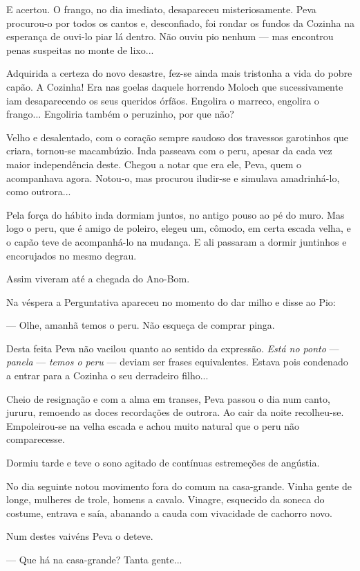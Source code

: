E acertou. O frango, no dia imediato, desapareceu misteriosamente. Peva
procurou-o por todos os cantos e, desconfiado, foi rondar os fundos da
Cozinha na esperança de ouvi-lo piar lá dentro. Não ouviu pio nenhum ---
mas encontrou penas suspeitas no monte de lixo...

Adquirida a certeza do novo desastre, fez-se ainda mais tristonha a vida
do pobre capão. A Cozinha! Era nas goelas daquele horrendo Moloch que
sucessivamente iam desaparecendo os seus queridos órfãos. Engolira o
marreco, engolira o frango... Engoliria também o peruzinho, por que não?

Velho e desalentado, com o coração sempre saudoso dos travessos
garotinhos que criara, tornou-se macambúzio. Inda passeava com o peru,
apesar da cada vez maior independência deste. Chegou a notar que era
ele, Peva, quem o acompanhava agora. Notou-o, mas procurou iludir-se e
simulava amadrinhá-lo, como outrora...

Pela força do hábito inda dormiam juntos, no antigo pouso ao pé do muro.
Mas logo o peru, que é amigo de poleiro, elegeu um, cômodo, em certa
escada velha, e o capão teve de acompanhá-lo na mudança. E ali passaram
a dormir juntinhos e encorujados no mesmo degrau.

Assim viveram até a chegada do Ano-Bom.

Na véspera a Perguntativa apareceu no momento do dar milho e disse ao
Pio:

--- Olhe, amanhã temos o peru. Não esqueça de comprar pinga.

Desta feita Peva não vacilou quanto ao sentido da expressão. \emph{Está
no ponto} --- \emph{panela} --- \emph{temos o peru} --- deviam ser
frases equivalentes. Estava pois condenado a entrar para a Cozinha o seu
derradeiro filho...

Cheio de resignação e com a alma em transes, Peva passou o dia num
canto, jururu, remoendo as doces recordações de outrora. Ao cair da
noite recolheu-se. Empoleirou-se na velha escada e achou muito natural
que o peru não comparecesse.

Dormiu tarde e teve o sono agitado de contínuas estremeções de angústia.

No dia seguinte notou movimento fora do comum na casa-grande. Vinha
gente de longe, mulheres de trole, homens a cavalo. Vinagre, esquecido
da soneca do costume, entrava e saía, abanando a cauda com vivacidade de
cachorro novo.

Num destes vaivéns Peva o deteve.

--- Que há na casa-grande? Tanta gente...

